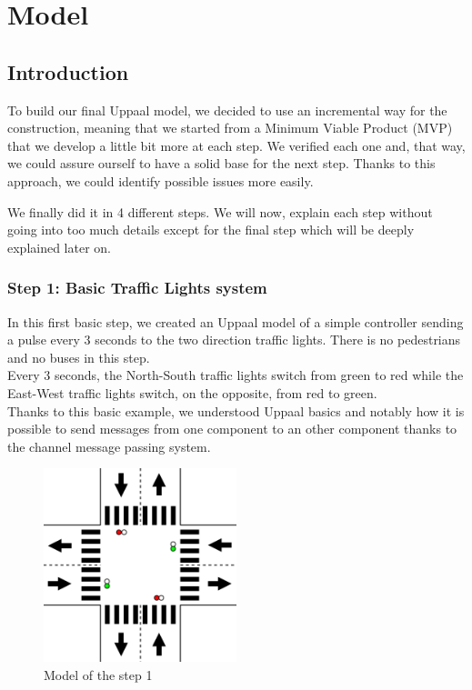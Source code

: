 \section{Model}

\subsection{Introduction}
To build our final Uppaal model, we decided to use an incremental way for the construction, meaning that we started from a Minimum Viable Product (MVP) that we develop a little bit more at each step. We verified each one and, that way, we could assure ourself to have a solid base for the next step. Thanks to this approach, we could identify possible issues more easily.

We finally did it in 4 different steps. We will now, explain each step without going into too much details except for the final step which will be deeply explained later on.

\subsubsection{Step 1: Basic Traffic Lights system}
In this first basic step, we created an Uppaal model of a simple controller sending a pulse every 3 seconds to the two direction traffic lights. There is no pedestrians and no buses in this step. \\
Every 3 seconds, the North-South traffic lights switch from green to red while the East-West traffic lights switch, on the opposite, from red to green. \\

Thanks to this basic example, we understood Uppaal basics and notably how it is possible to send messages from one component to an other component thanks to the channel message passing system. \\

\begin{figure}[H]\label{fig:step1}
  \centering
    \includegraphics[width=0.5\textwidth]{picture/model/trafficlight_step1_s1.png}
    \caption{Model of the step 1}
\end{figure}

